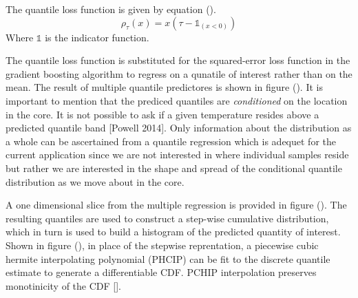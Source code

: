 The quantile loss function is given by equation ().
\begin{equation}
\rho_\tau(x) = x(\tau - \mathbb{1}_{(x < 0)})
\end{equation}
Where $\mathbb{1}$ is the indicator function.

The quantile loss function is substituted for the squared-error loss function in the gradient boosting algorithm to regress on a qunatile of interest rather than on the mean.  The result of multiple quantile predictores is shown in figure ().  It is important to mention that the prediced quantiles are \emph{conditioned} on the location in the core.  It is not possible to ask if a given temperature resides above a predicted quantile band [Powell 2014]. Only information about the distribution as a whole can be ascertained from a quantile regression which is adequet for the current application since we are not interested in where individual samples reside but rather we are interested in the shape and spread of the conditional quantile distribution as we move about in the core.

A one dimensional slice from the multiple regression is provided in figure ().
The resulting quantiles are used to construct a step-wise cumulative distribution, which in turn is used to build a histogram of the predicted quantity of interest. \\

Shown in figure (), in place of the stepwise reprentation, a piecewise cubic hermite interpolating polynomial (PHCIP) can be fit to the discrete quantile estimate to generate a differentiable CDF.
PCHIP interpolation preserves monotinicity of the CDF [].
